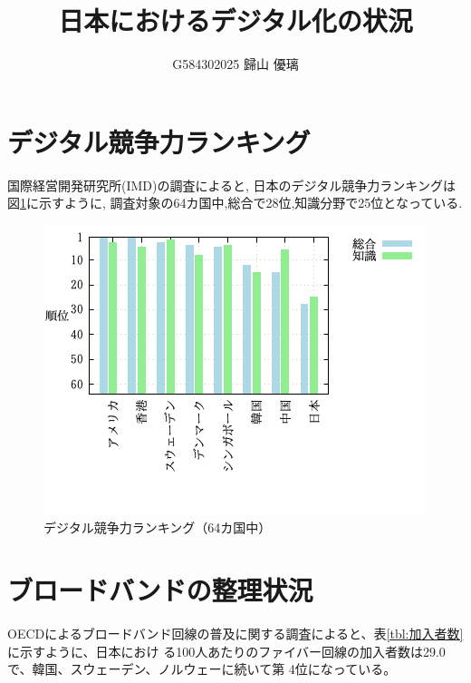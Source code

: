 \documentclass[a4paper,11pt,dvipdfmx]{ujarticle}
\title{日本におけるデジタル化の状況}
\author{G584302025 歸山 優璃}
\begin{document}
\maketitle %

\section{デジタル競争力ランキング}

国際経営開発研究所(IMD)の調査\cite{imd}によると,
日本のデジタル競争力ランキングは図\ref{fig:ランキング}に示すように,
調査対象の64カ国中,総合で28位,知識分野で25位となっている.


\begin{figure}[htbp]
    \centering
    \includegraphics{fig31.png}
    \caption{デジタル競争力ランキング（64カ国中）}\label{fig:ランキング}
\end{figure}

\section{ブロードバンドの整理状況}

OECDによるブロードバンド回線の普及に関する調査\cite{oecd}によると、表\ref{tbl:加入者数}に示すように、日本におけ
る100人あたりのファイバー回線の加入者数は29.0で、韓国、スウェーデン、ノルウェーに続いて第
4位になっている。
\end{document}
